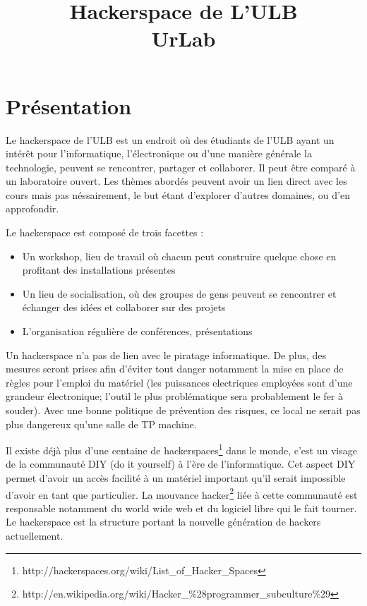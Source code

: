 \documentclass{article}
\title{Hackerspace de L'ULB\\ \fontsize{90}{100}\selectfont UrLab}
\author{ }
\begin{document}
\maketitle{}
\newpage
\tableofcontents
\newpage
\setlength{\parskip}{0.5ex plus 0.2ex minus 0.2ex}
\setlength{\parindent}{0pt}

\section{Présentation}

Le hackerspace de l'ULB est un endroit où des étudiants de l'ULB ayant un intérêt 
pour l'informatique, l'électronique ou d'une manière générale la technologie, 
peuvent se rencontrer, partager et collaborer. Il peut être comparé à un laboratoire ouvert.
Les thèmes abordés peuvent avoir un lien direct avec les cours mais pas néssairement, le but étant d'explorer d'autres domaines, ou d'en approfondir.

Le hackerspace est composé de trois facettes : 
\begin{itemize}
\item Un workshop, lieu de travail où chacun peut construire quelque chose en profitant 
des installations présentes
\item Un lieu de socialisation, où des groupes de gens peuvent se rencontrer
et échanger des idées et collaborer sur des projets
\item L'organisation régulière de conférences, présentations\end{itemize}

Un hackerspace n'a pas de lien avec le piratage informatique.
De plus, des mesures seront prises afin d'éviter tout danger notamment la mise en place de règles pour l'emploi du matériel (les puissances electriques employées sont d'une grandeur électronique; l'outil le plus problématique sera probablement le fer à souder). Avec une bonne politique de prévention des risques, ce local ne serait pas plus dangereux qu'une salle de TP machine.

Il existe déjà plus d'une centaine de hackerspaces\footnote{http://hackerspaces.org/wiki/List\_of\_Hacker\_Spaces} dans le monde, c'est un visage de la communauté DIY (do it yourself) à l'ère de
l'informatique. Cet aspect DIY permet d'avoir un accès facilité à un
matériel important qu'il serait impossible d'avoir en tant que
particulier. La mouvance hacker\footnote{http://en.wikipedia.org/wiki/Hacker\_\%28programmer\_subculture\%29} liée à cette communauté est responsable notamment du world wide web et du logiciel libre qui le fait tourner. Le hackerspace est la structure portant la nouvelle génération de hackers actuellement.
\end{document}
